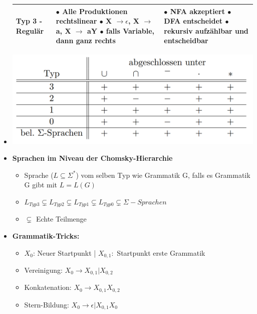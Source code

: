 \documentclass[11pt,a4paper]{article}
\begin{document}
\begin{itemize}
\begin{longtable}[h]{|p{4cm} | p{6cm} | p{7cm}|}
Typ 3 - Regulär &  \makecell[l]{$\bullet$ Alle Produktionen rechtslinear \\
$\bullet$ X $\rightarrow \epsilon$, X $\rightarrow$ a, X $\rightarrow$ aY \\
$\bullet$ falls Variable, dann ganz rechts} &
\makecell[l]{$\bullet$ NFA akzeptiert \\ $\bullet$ DFA entscheidet \\$\bullet$ rekursiv aufzählbar und entscheidbar} \\ \hline

\end{longtable}

\item[]
	\begin{center}
	\includegraphics[width=14cm]{Bilder/abschlussgrammatiken}
	\end{center}
	
\item \textbf{Sprachen im Niveau der Chomsky-Hierarchie}
	\begin{itemize}
	
	\item Sprache ($L \subseteq \Sigma^*$)	vom selben Typ wie Grammatik G, falls es Grammatik G gibt mit $L = L(G)$
	\item $L_{Typ3} \subsetneq L_{Typ2} \subsetneq L_{Typ1} \subsetneq L_{Typ0} \subsetneq \Sigma-Sprachen$
	\item $\subsetneq$ Echte Teilmenge
	
	\end{itemize}
	
\item \textbf{Grammatik-Tricks:}
	\begin{itemize}
	\item $X_0$: Neuer Startpunkt | $X_{0,1}:$ Startpunkt erste Grammatik
	\item Vereinigung: $X_0 \rightarrow X_{0,1} | X_{0,2}$
	\item Konkatenation: $X_0 \rightarrow X_{0,1} X_{0,2}$
	\item Stern-Bildung: $X_0 \rightarrow \epsilon|X_{0,1}X_0$ 
	\end{itemize}
	

\end{itemize}
\end{document}
